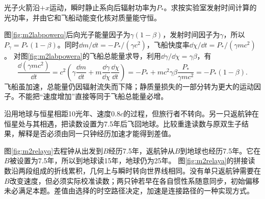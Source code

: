 \begin{exercise}\label{ex:m2labpower}
光子火箭沿$+x$运动，瞬时静止系向后辐射功率为$P_*$。求按实验室发射时间计算的光功率，并由它和飞船动能变化核对质量能守恒。
\end{exercise}
\begin{solution}
图\ref{fig:m2labpowerq}后向光子能量因子为$\gamma(1-\beta)$，发射时间因子为$\gamma$，所以$P_\gamma=P_*(1-\beta)$。同时$\dd m/\dd t=-P_*/(\gamma c^2)$，飞船快度率$\dd\chi/\dd t=P_*/(\gamma mc^2)$。
对图\ref{fig:m2labpowera}的飞船总能量求导，利用$\dd\gamma/\dd\chi=\gamma\beta$，有
\[
 \frac{\dd(\gamma mc^2)}{\dd t}
 =c^2\left(\gamma\frac{\dd m}{\dd t}
 +m\frac{\dd\gamma}{\dd\chi}\frac{\dd\chi}{\dd t}\right)
 =-P_*+mc^2\gamma\beta\frac{P_*}{\gamma mc^2}
 =-P_*(1-\beta).
\]
飞船虽加速，总能量仍因辐射流失而下降；静质量损失的一部分转为更大的运动因子。不能把“速度增加”直接等同于飞船总能量必增。
\end{solution}

\begin{exercise}\label{ex:m2relay}
沿用地球与恒星相距10光年、速度$0.8c$的过程，但旅行者不转向。另一只返航钟在恒星处与其相遇，把读数设置为7.5年后飞回地球。比较重逢读数与原双生子结果，解释是否必须由同一只钟经历加速才能得到差值。
\end{exercise}
\begin{solution}
图\ref{fig:m2relayq}去程钟从出发到$B$经历7.5年，返航钟从$B$到地球也经历7.5年。它在$B$被设置为7.5年，所以到地球读15年，地球仍为25年。
图\ref{fig:m2relaya}的拼接读数沿两段组成的折线累积，几何上与瞬时转向世界线相同。没有单只返航钟需要在$B$改变速度，但必须实际校准读数；两只钟若早在各自惯性系随意同步，初始偏移未必满足本题。差值由选择的时空路径决定，加速是连接路径的一种实现方式。
\end{solution}

